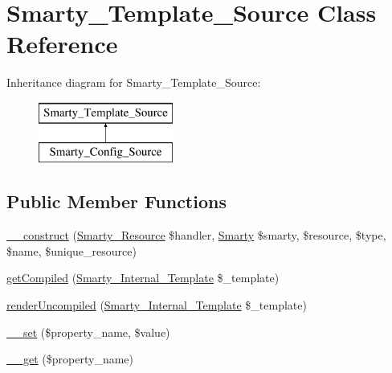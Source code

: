 \hypertarget{class_smarty___template___source}{}\section{Smarty\+\_\+\+Template\+\_\+\+Source Class Reference}
\label{class_smarty___template___source}
Inheritance diagram for Smarty\+\_\+\+Template\+\_\+\+Source\+:\begin{figure}[H]
\begin{center}
\leavevmode
\includegraphics[height=2.000000cm]{class_smarty___template___source}
\end{center}
\end{figure}
\subsection*{Public Member Functions}
\begin{DoxyCompactItemize}
\item 
\hyperlink{class_smarty___template___source_a1b175af6efed8fa7081e2c8cebe4a13d}{\+\_\+\+\_\+construct} (\hyperlink{class_smarty___resource}{Smarty\+\_\+\+Resource} \$handler, \hyperlink{class_smarty}{Smarty} \$smarty, \$resource, \$type, \$name, \$unique\+\_\+resource)
\item 
\hyperlink{class_smarty___template___source_ae8c99828f19fc3c3912da0efabf01022}{get\+Compiled} (\hyperlink{class_smarty___internal___template}{Smarty\+\_\+\+Internal\+\_\+\+Template} \$\+\_\+template)
\item 
\hyperlink{class_smarty___template___source_af8c011d9b5a4c8aff68b7027bbaf67f3}{render\+Uncompiled} (\hyperlink{class_smarty___internal___template}{Smarty\+\_\+\+Internal\+\_\+\+Template} \$\+\_\+template)
\item 
\hyperlink{class_smarty___template___source_a3a449beac9d0c7fdd8325b61b21f52a0}{\+\_\+\+\_\+set} (\$property\+\_\+name, \$value)
\item 
\hyperlink{class_smarty___template___source_a51458d48bdbac63ccde60e4ae3357388}{\+\_\+\+\_\+get} (\$property\+\_\+name)
\end{DoxyCompactItemize}
